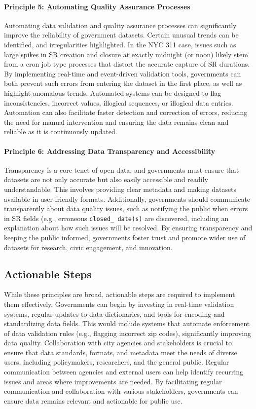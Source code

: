 \documentclass[linenumber]{jdsart}
\begin{document}
\paragraph{Principle 5: Automating Quality Assurance Processes}
Automating data validation and quality assurance processes can 
significantly improve the reliability of government datasets. Certain
unusual trends can be identified, and irregularities highlighted. 
In the NYC 311 case, issues such as large spikes in SR 
creation and closure at exactly midnight (or noon) likely 
stem from a cron job type processes that distort the 
accurate capture of SR durations. By implementing 
real\mbox{-}time and event\mbox{-}driven validation tools, governments 
can both prevent such errors from entering the dataset in the first 
place, as well as highlight anomalous trends. Automated 
systems can be designed to flag inconsistencies, incorrect values, 
illogical sequences, or illogical data entries. Automation can 
also facilitate faster detection and correction of errors, reducing 
the need for manual intervention and ensuring the data 
remains clean and reliable as it is continuously updated.

\paragraph{Principle 6: Addressing Data Transparency and Accessibility}
Transparency is a core tenet of open data, and governments must ensure 
that datasets are not only accurate but also easily accessible and 
readily understandable. This involves providing clear 
metadata and making datasets available in user\mbox{-}friendly 
formats. Additionally, governments should communicate transparently about 
data quality issues, such as notifying the public when errors in SR 
fields (e.g., erroneous \texttt{closed\_ date(s)} are discovered, including
an explanation about how such issues will be resolved. By 
ensuring transparency and keeping the public informed, 
governments foster trust and promote wider use of datasets 
for research, civic engagement, and innovation.


\subsection{Actionable Steps}
While these principles are broad, actionable steps are required to 
implement them effectively. Governments can begin by investing in 
real\mbox{-}time validation systems, regular updates to data dictionaries, 
and tools for encoding and standardizing data fields. This would include
systems that automate enforcement of data validation rules 
(e.g., flagging incorrect zip codes), significantly improving data 
quality. Collaboration with city agencies and stakeholders is crucial 
to ensure that data standards, formats, and metadata meet the needs 
of diverse users, including policymakers, researchers, and the 
general public. Regular communication between agencies and external 
users can help identify recurring issues and areas where improvements 
are needed. By facilitating regular communication and collaboration 
with various stakeholders, governments can ensure data remains relevant 
and actionable for public use.
\end{document}
